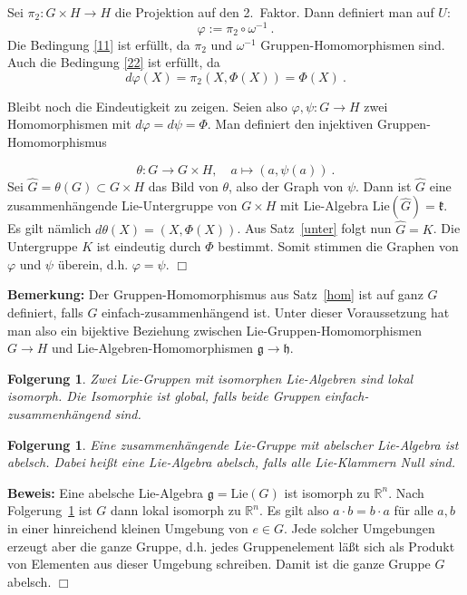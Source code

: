 \documentclass[12pt,a4paper]{article}
\def\R{\mathbb{R}}
\def\Lie{\mathrm{Lie}}
\def\g{\mathfrak{g}}
\def\k{\mathfrak{k}}
\def\h{\mathfrak{h}}
\newtheorem{Folgerung}[Lemma]{Folgerung}
\def\proof{\noindent\textbf{Beweis:}\quad}
\def\qed{\quad\hfill\ensuremath{\Box}}
\begin{document}
\medskip

Sei $\pi_2 : G\times H \rightarrow H$ die Projektion auf den 2.~Faktor. Dann definiert man auf $U$:
$$
\varphi := \pi_2 \circ \omega^{-1} \ .
$$
Die Bedingung \ref{11} ist erf\"ullt, da $\pi_2$ und $\omega^{-1}$ Gruppen-Homomorphismen sind. Auch
die Bedingung \ref{22} ist erf\"ullt, da
$$
d\varphi (X) = \pi_2 (X, \Phi(X)) = \Phi(X) \ .
$$

\medskip

Bleibt noch die Eindeutigkeit zu zeigen. Seien also $\varphi, \psi : G\rightarrow H$ zwei Homomorphismen
mit $d\varphi = d\psi =\Phi $. Man definiert den injektiven Gruppen-Homomorphismus

$$
\theta : G \rightarrow G\times H, \quad a\mapsto (a, \psi(a)) \ .
$$
Sei $\hat G = \theta(G) \subset G\times H$ das Bild von $\theta$, also der Graph von $\psi$.
Dann ist $\hat G$ eine zusammenh\"angende
Lie-Untergruppe von $G\times H$ mit Lie-Algebra $\Lie(\hat G) = \k$. Es gilt n\"amlich
$d\theta(X) = (X, \Phi(X))$. Aus Satz~\ref{unter} folgt nun $\hat G = K$. Die Untergruppe $K$ ist
eindeutig durch $\Phi$ bestimmt. Somit stimmen die Graphen von $\varphi$ und $\psi$
\"uberein, d.h. $\varphi = \psi$.
\qed

\bigskip

{\bf Bemerkung:}
Der Gruppen-Homomorphismus aus Satz~\ref{hom} ist auf ganz $G$ definiert, falls
$G$ einfach-zusammenh\"angend ist. Unter dieser Voraussetzung hat man also ein
bijektive Beziehung zwischen Lie-Gruppen-Homomorphismen $G\rightarrow H$
und Lie-Algebren-Homomorphismen $\g \rightarrow \h$.

\bigskip

\begin{Folgerung}\label{hom1}
Zwei Lie-Gruppen mit isomorphen Lie-Algebren sind lokal isomorph. Die Isomorphie
ist global, falls beide Gruppen einfach-zusammenh\"angend sind.
\end{Folgerung}



\begin{Folgerung}
Eine zusammenh\"angende Lie-Gruppe mit abelscher Lie-Algebra ist abelsch. Dabei hei\ss t
eine Lie-Algebra abelsch, falls alle Lie-Klammern Null sind.
\end{Folgerung}
\proof
Eine abelsche Lie-Algebra $\g = \Lie(G)$ ist isomorph zu $\R^n$. Nach Folgerung~\ref{hom1}
ist $G$ dann lokal isomorph zu $\R^n$. Es gilt also $a\cdot b = b \cdot a$ f\"ur alle
$a,b$ in einer hinreichend kleinen Umgebung von $e\in G$. Jede solcher Umgebungen erzeugt
aber die ganze Gruppe, d.h. jedes Gruppenelement l\"a\ss t sich als Produkt von Elementen
aus dieser Umgebung schreiben. Damit ist die ganze Gruppe $G$ abelsch.
\qed
\end{document}
